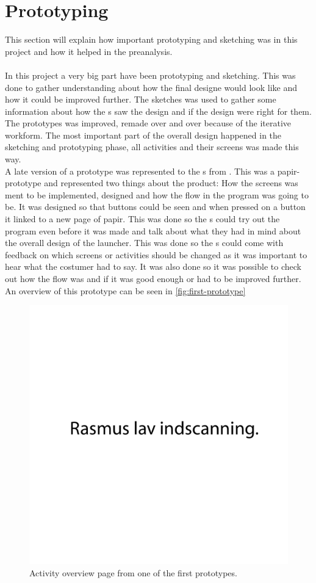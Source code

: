 \section{Prototyping}
This section will explain how important prototyping and sketching was in this project and how it helped in the preanalysis. \\\\
In this project a very big part have been prototyping and sketching. This was done to gather understanding about how the final designe would look like and how it could be improved further. The sketches was used to gather some information about how the \guardian{}s saw the design and if the design were right for them. The prototypes was improved, remade over and over because of the iterative workform. The most important part of the overall design happened in the sketching and prototyping phase, all activities and their screens was made this way. \\
A late version of a prototype was represented to the \guardian{}s from \egebakken{}. This was a papir-prototype and represented two things about the product: How the screens was ment to be implemented, designed and how the flow in the program was going to be. It was designed so that buttons could be seen and when pressed on a button it linked to a new page of papir. This was done so the \guardian{}s could try out the program even before it was made and talk about what they had in mind about the overall design of the launcher.
This was done so the \guardian{}s could come with feedback on which screens or activities should be changed as it was important to hear what the costumer had to say. It was also done so it was possible to check out how the flow was and if it was good enough or had to be improved further. An overview of this prototype can be seen in \autoref{fig:first-prototype}

\begin{figure}[h!]
	\centering
	\includegraphics[scale=0.5]{gfx/first-prototype.pdf}
	\caption{Activity overview page from one of the first prototypes.}
	\label{fig:first-prototype}
\end{figure}

